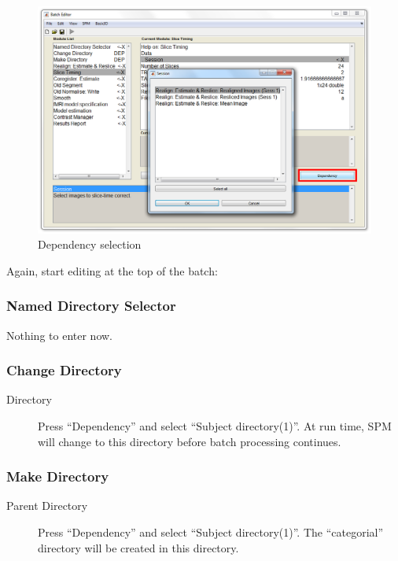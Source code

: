 \begin{figure}[htbp]
  \centering
  \includegraphics[width=\textwidth]{batch/batch_dependencies}
  \caption{Dependency selection}
  \label{fig:batch_dependency}
\end{figure}

Again, start editing at the top of the batch:

\subsubsection*{Named Directory Selector}

Nothing to enter now.

\subsubsection*{Change Directory}

\begin{description}
\item[Directory] Press ``Dependency'' and select ``Subject
  directory(1)''. At run time, SPM will change to this directory before batch
  processing continues.
\end{description}

\subsubsection*{Make Directory}

\begin{description}
\item[Parent Directory] Press ``Dependency'' and select ``Subject
  directory(1)''. The ``categorial'' directory will be created in this
  directory. 
\end{description}

